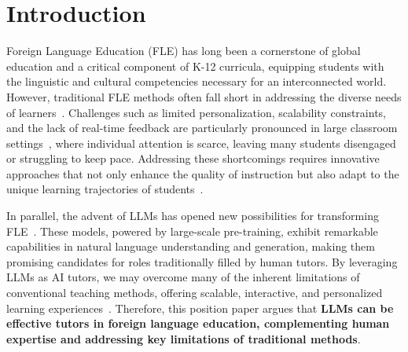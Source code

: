 \section{Introduction}\label{sec:introduction}

Foreign Language Education (FLE) has long been a cornerstone of global education and a critical component of K-12 curricula, equipping students with the linguistic and cultural competencies necessary for an interconnected world. However, traditional FLE methods often fall short in addressing the diverse needs of learners~\cite{hou2020foreign}. Challenges such as limited personalization, scalability constraints, and the lack of real-time feedback are particularly pronounced in large classroom settings~\cite{ehrenberg2001class}, where individual attention is scarce, leaving many students disengaged or struggling to keep pace. Addressing these shortcomings requires innovative approaches that not only enhance the quality of instruction but also adapt to the unique learning trajectories of students~\cite{eaton2010global}.

In parallel, the advent of LLMs has opened new possibilities for transforming FLE~\cite{caines2023application}. These models, powered by large-scale pre-training, exhibit remarkable capabilities in natural language understanding and generation, making them promising candidates for roles traditionally filled by human tutors. By leveraging LLMs as AI tutors, we may overcome many of the inherent limitations of conventional teaching methods, offering scalable, interactive, and personalized learning experiences~\cite{chen2024empowering,schmucker2024ruffle}. Therefore, this position paper argues that \textbf{LLMs can be effective tutors in foreign language education, complementing human expertise and addressing key limitations of traditional methods}.





